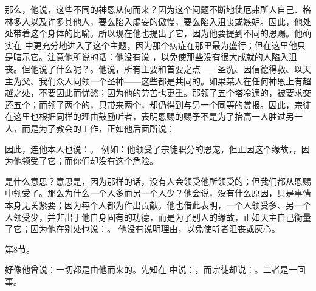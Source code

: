 \par

那么，他说，这些不同的神恩从何而来？因为这个问题不断地使厄弗所人自己、格林多人以及许多其他人，要么陷入虚妄的傲慢，要么陷入沮丧或嫉妒。因此，他处处带着这个身体的比喻。所以现在他也提出了它，因为他要提到不同的恩赐。他确实在  中更充分地进入了这个主题，因为那个病症在那里最为盛行；但在这里他只是暗示它。注意他所说的话：他没有说 ，以免使那些没有很大成就的人陷入沮丧。但他说了什么呢？。他说，所有主要和首要之点——圣洗、因信德得救、以天主为父、我们众人同领一个圣神——这些都是共同的。如果某人在任何神恩上有超越之处，不要因此而忧愁；因为他的劳苦也更重。那领了五个塔冷通的，被要求交还五个；而领了两个的，只带来两个，却仍得到与另一个同等的赏报。因此，宗徒在这里也根据同样的理由鼓励听者，表明恩赐的赐予不是为了抬高一人胜过另一人，而是为了教会的工作，正如他后面所说：\par

\par

因此，连他本人也说：。 例如：他领受了宗徒职分的恩宠，但正因这个缘故，，因为他领受了它；而你们却没有这个危险。\par

\par

是什么意思？意思是，因为那样的话，没有人会领受他所领受的；但我们都从恩赐中领受了。那么为什么一个人多而另一个人少？他会说，没有什么原因，只是事情本身无关紧要；因为每个人都为作出贡献。他也借此表明，一个人领受多、另一个人领受少，并非出于他自身固有的功德，而是为了别人的缘故，正如天主自己衡量了它；因为他在别处也说：。 他没有说明理由，以免使听者沮丧或灰心。\par

第8节。\par

好像他曾说：一切都是由他而来的。先知在  中说：，而宗徒却说：。二者是一回事。\par


